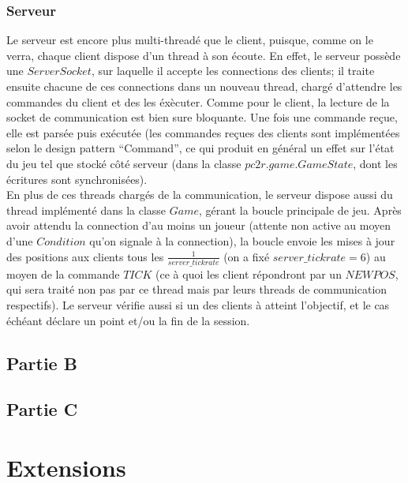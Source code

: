 \documentclass{article}
\begin{document}
\subsubsection{Serveur}
Le serveur est encore plus multi-threadé que le client, puisque, comme on le verra, chaque client dispose d'un thread à son écoute. En effet, le serveur possède une $ServerSocket$, sur laquelle il accepte les connections des clients; il traite ensuite chacune de ces connections dans un nouveau thread, chargé d'attendre les commandes du client et des les éxècuter. Comme pour le client, la lecture de la socket de communication est bien sure bloquante. Une fois une commande reçue, elle est parsée puis exécutée (les commandes reçues des clients sont implémentées selon le design pattern ``Command'', ce qui produit en général un effet sur l'état du jeu tel que stocké côté serveur (dans la classe $pc2r.game.GameState$, dont les écritures sont synchronisées).\\
En plus de ces threads chargés de la communication, le serveur dispose aussi du thread implémenté dans la classe $Game$, gérant la boucle principale de jeu. Après avoir attendu la connection d'au moins un joueur (attente non active au moyen d'une $Condition$ qu'on signale à la connection), la boucle envoie les mises à jour des positions aux clients tous les $\frac{1}{server\_tickrate}$ (on a fixé $server\_tickrate = 6$) au moyen de la commande $TICK$ (ce à quoi les client répondront par un $NEWPOS$, qui sera traité non pas par ce thread mais par leurs threads de communication respectifs). Le serveur vérifie aussi si un des clients à atteint l'objectif, et le cas échéant déclare un point et/ou la fin de la session.

\subsection{Partie B}

\subsection{Partie C}

\section{Extensions}
\end{document}
